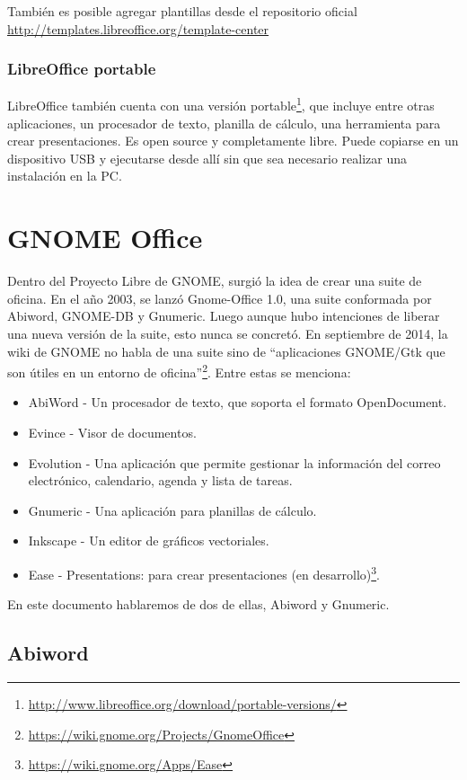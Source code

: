 \documentclass[12pt]{article}
\begin{document}
También es posible agregar plantillas desde el repositorio oficial \url{http://templates.libreoffice.org/template-center}

\subsubsection{LibreOffice portable}

LibreOffice también cuenta con una versión portable\footnote{\url{http://www.libreoffice.org/download/portable-versions/}}, que incluye entre otras aplicaciones, un procesador de texto, planilla de cálculo, una herramienta para crear presentaciones. Es open source y completamente libre. Puede copiarse en un dispositivo USB y ejecutarse desde allí sin que sea necesario realizar una instalación en la PC.

\section{GNOME Office}

Dentro del Proyecto Libre de GNOME, surgió la idea de crear una suite de oficina. En el año 2003, se lanzó Gnome-Office 1.0, una suite conformada por Abiword, GNOME-DB y Gnumeric. Luego aunque hubo intenciones de liberar una nueva versión de la suite, esto nunca se concretó. En septiembre de 2014, la wiki de GNOME no habla de una suite sino de ``aplicaciones GNOME/Gtk que son útiles en un entorno de oficina''\footnote{\url{https://wiki.gnome.org/Projects/GnomeOffice}}. Entre estas se menciona:
\begin{itemize}
\item AbiWord - Un procesador de texto, que soporta el formato OpenDocument.
\item Evince - Visor de documentos.
\item Evolution - Una aplicación que permite gestionar la información del correo electrónico, calendario, agenda y lista de tareas.
\item Gnumeric - Una aplicación para planillas de cálculo.
\item Inkscape - Un editor de gráficos vectoriales.
\item Ease - Presentations: para crear presentaciones (en desarrollo)\footnote{\url{https://wiki.gnome.org/Apps/Ease}}.
\end{itemize}

En este documento hablaremos de dos de ellas, Abiword y Gnumeric. 

\subsection{Abiword}
\end{document}

